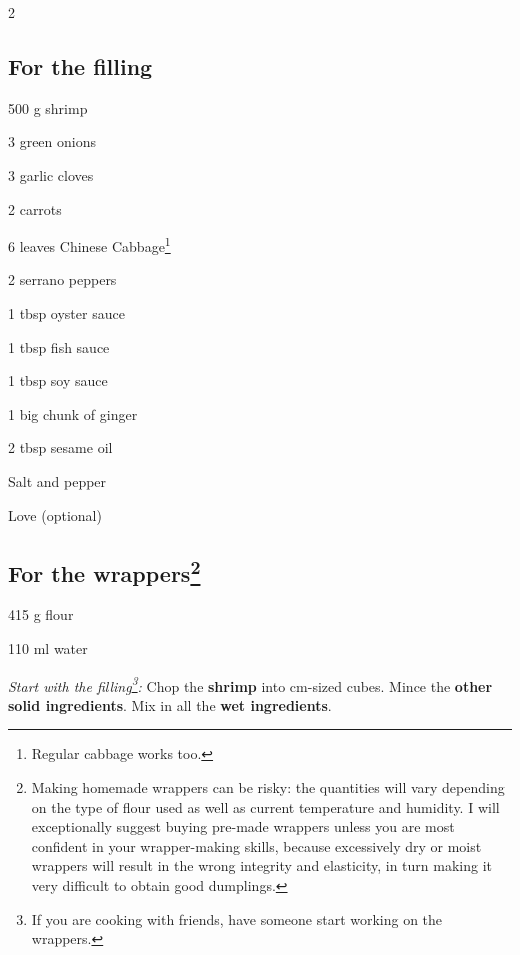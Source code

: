 \newpage
{}

\begin{multicols}{2}
	\subsection*{For the filling}
	\begin{ingredients}
		\item 500 g shrimp
		\item 3 green onions
		\item 3 garlic cloves
		\item 2 carrots
		\item 6 leaves Chinese Cabbage\footnote{Regular cabbage works too.}
		\item 2 serrano peppers
		\item 1 tbsp oyster sauce
		\item 1 tbsp fish sauce
		\item 1 tbsp soy sauce
		\item 1 big chunk of ginger
		\item 2 tbsp sesame oil
		\item Salt and pepper
		\item Love (optional)
	\end{ingredients}
	
	\subsection*{For the wrappers\footnote{Making homemade wrappers can be risky: the quantities will vary depending on the type of flour used as well as current temperature and humidity. I will exceptionally suggest buying pre-made wrappers unless you are most confident in your wrapper-making skills, because excessively dry or moist wrappers will result in the wrong integrity and elasticity, in turn making it very difficult to obtain good dumplings.}}
	\begin{ingredients}
		\item 415 g flour
		\item 110 ml water
	\end{ingredients}
	\end{multicols}

\textit{Start with the filling\footnote{If you are cooking with friends, have someone start working on the wrappers.}:} Chop the \textbf{shrimp} into cm-sized cubes. 
Mince the \textbf{other solid ingredients}. 
Mix in all the \textbf{wet ingredients}.

